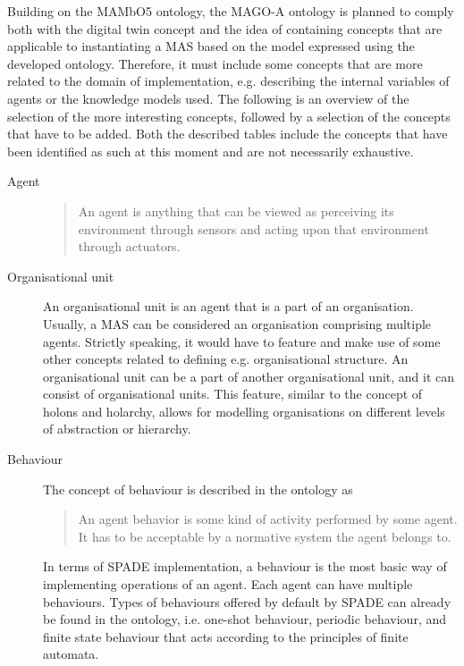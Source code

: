 Building on the MAMbO5 ontology, the MAGO-A ontology is planned to comply both with the digital twin concept and the idea of containing concepts that are applicable to instantiating a \ac{MAS} based on the model expressed using the developed ontology. Therefore, it must include some concepts that are more related to the domain of implementation, e.g. describing the internal variables of agents or the knowledge models used. The following is an overview of the selection of the more interesting concepts, followed by a selection of the concepts that have to be added. Both the described tables include the concepts that have been identified as such at this moment and are not necessarily exhaustive. 

\begin{description}
    \item [Agent]
    \blockquote[{{\cite[p. 54]{russell2022ArtificialIntelligenceModern}}}]{An agent is anything that can be viewed as perceiving its environment through sensors and acting upon that environment through actuators.}
    
    \item [Organisational unit] An organisational unit is an agent that is a part of an organisation. Usually, a \ac{MAS} can be considered an organisation comprising multiple agents. Strictly speaking, it would have to feature and make use of some other concepts related to defining e.g. organisational structure. An organisational unit can be a part of another organisational unit, and it can consist of organisational units. This feature, similar to the concept of holons and holarchy, allows for modelling organisations on different levels of abstraction or hierarchy.

    \item [Behaviour] The concept of behaviour is described in the  ontology as \blockquote{An agent behavior is some kind of activity performed by some agent. It has to be acceptable by a normative system the agent belongs to.} In terms of SPADE implementation, a behaviour is the most basic way of implementing operations of an agent. Each agent can have multiple behaviours. Types of behaviours offered by default by SPADE can already be found in the  ontology, i.e. one-shot behaviour, periodic behaviour, and finite state behaviour that acts according to the principles of finite automata.


\end{description}
